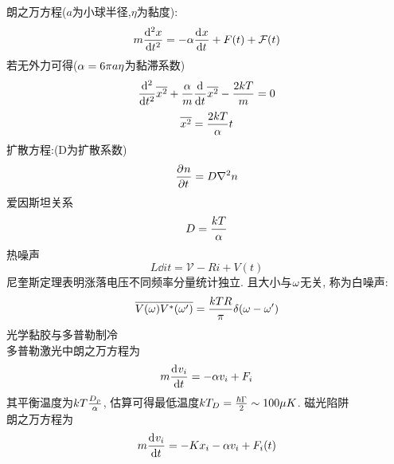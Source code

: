 \documentclass[UTF8,9pt]{ctexart}
\begin{document}
朗之万方程($a$为小球半径,$\eta$为黏度):
$$m\dt[2]x=-\a\dt{x}+F(t)+\mathcal{F}(t)$$
若无外力可得($\a=6\pi a\eta$为黏滞系数)
$$\dt[2]{}\bar{x^2}+\f{\a}{m}\dt{}\bar{x^2}-\f{2kT}{m}=0$$
$$\bar{x^2}=\f{2kT}{\a}t$$
扩散方程:(D为扩散系数)
$$\pp{n}{t}=D\nabla^2n$$
爱因斯坦关系
$$D=\f{kT}{\a}$$
热噪声
$$L\dd{i}{t}=\mathcal{V}-Ri+V(t)$$
尼奎斯定理表明涨落电压不同频率分量统计独立. 且大小与$\o$无关, 称为白噪声:
$$\bar{V(\o)V^*(\o')}=\f{kTR}{\pi}\de(\o-\o')$$
光学黏胶与多普勒制冷\\
多普勒激光中朗之万方程为
$$m\dd{v_i}{t}=-\a v_i+F_i$$
其平衡温度为$kT\f{D_p}{\a}$, 估算可得最低温度$kT_D=\f{\hbar\Gamma}{2}\sim100\mu K$. 
磁光陷阱\\
朗之万方程为
$$m\dt{v_i}=-Kx_i-\a v_i+F_i(t)$$ 
\end{document}
